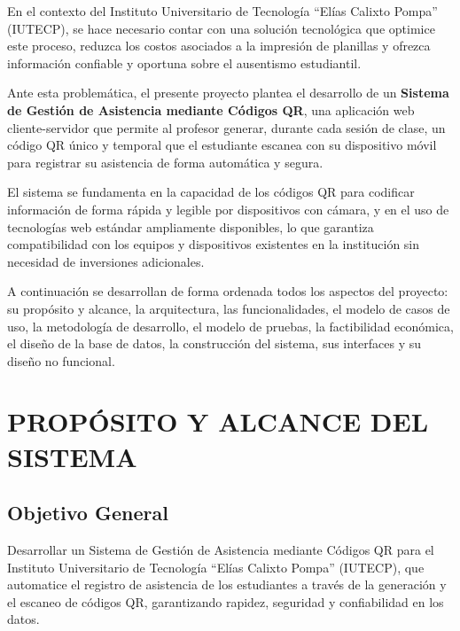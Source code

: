 \documentclass[12pt, letterpaper, oneside]{report}
\begin{document}
En el contexto del Instituto Universitario de Tecnolog\'ia ``El\'ias Calixto Pompa'' (IUTECP), se hace necesario contar con una soluci\'on tecnol\'ogica que optimice este proceso, reduzca los costos asociados a la impresi\'on de planillas y ofrezca informaci\'on confiable y oportuna sobre el ausentismo estudiantil.

Ante esta problem\'atica, el presente proyecto plantea el desarrollo de un \textbf{Sistema de Gesti\'on de Asistencia mediante C\'odigos QR}, una aplicaci\'on web cliente-servidor que permite al profesor generar, durante cada sesi\'on de clase, un c\'odigo QR \'unico y temporal que el estudiante escanea con su dispositivo m\'ovil para registrar su asistencia de forma autom\'atica y segura.

El sistema se fundamenta en la capacidad de los c\'odigos QR para codificar informaci\'on de forma r\'apida y legible por dispositivos con c\'amara, y en el uso de tecnolog\'ias web est\'andar ampliamente disponibles, lo que garantiza compatibilidad con los equipos y dispositivos existentes en la instituci\'on sin necesidad de inversiones adicionales.

A continuaci\'on se desarrollan de forma ordenada todos los aspectos del proyecto: su prop\'osito y alcance, la arquitectura, las funcionalidades, el modelo de casos de uso, la metodolog\'ia de desarrollo, el modelo de pruebas, la factibilidad econ\'omica, el dise\~no de la base de datos, la construcci\'on del sistema, sus interfaces y su dise\~no no funcional.

\newpage

\chapter{PROP\'OSITO Y ALCANCE DEL SISTEMA}

\section{Objetivo General}

Desarrollar un Sistema de Gesti\'on de Asistencia mediante C\'odigos QR para el Instituto Universitario de Tecnolog\'ia ``El\'ias Calixto Pompa'' (IUTECP), que automatice el registro de asistencia de los estudiantes a trav\'es de la generaci\'on y el escaneo de c\'odigos QR, garantizando rapidez, seguridad y confiabilidad en los datos.
\end{document}
